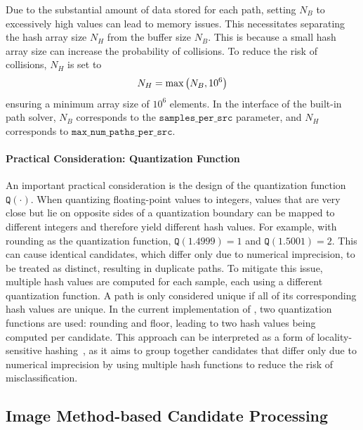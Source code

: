Due to the substantial amount of data stored for each path, setting $N_B$ to excessively high values can lead to memory issues. This necessitates separating the hash array size $N_H$ from the buffer size $N_B$. This is because a small hash array size can increase the probability of collisions. To reduce the risk of collisions, $N_H$ is set to
\begin{equation}
    N_H = \max\left( N_B, 10^6 \right)
\end{equation}
ensuring a minimum array size of $10^6$ elements. In the interface of the \SRT{} built-in path solver, $N_B$ corresponds to the $\texttt{samples\_per\_src}$ parameter, and $N_H$ corresponds to $\texttt{max\_num\_paths\_per\_src}$.

\paragraph{Practical Consideration: Quantization Function}
An important practical consideration is the design of the quantization function $\texttt{Q}(\cdot)$.
When quantizing floating-point values to integers, values that are very close but lie on opposite sides of a quantization boundary can be mapped to different integers and therefore yield different hash values. For example, with rounding as the quantization function, $\texttt{Q}(1.4999)=1$ and $\texttt{Q}(1.5001)=2$.
This can cause identical candidates, which differ only due to numerical imprecision, to be treated as distinct, resulting in duplicate paths.
To mitigate this issue, multiple hash values are computed for each sample, each using a different quantization function. A path is only considered unique if all of its corresponding hash values are unique.
In the current implementation of \SRT{}, two quantization functions are used: rounding and floor, leading to two hash values being computed per candidate.
This approach can be interpreted as a form of locality-sensitive hashing~\cite{Wikipedia_Locality_Sensitive_Hashing}, as it aims to group together candidates that differ only due to numerical imprecision by using multiple hash functions to reduce the risk of misclassification.

\subsection{Image Method-based Candidate Processing}
\label{sec:path-solver-im}

